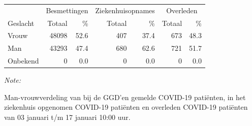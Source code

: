 \documentclass[
  english,
  man,floatsintext]{apa6}
\begin{document}
\begin{table}[H]
\centering\begingroup\fontsize{11}{13}\selectfont

\begin{threeparttable}
\begin{tabular}{lrrrrrr}
\toprule
\multicolumn{1}{c}{ } & \multicolumn{2}{c}{Besmettingen} & \multicolumn{2}{c}{Ziekenhuisopnames} & \multicolumn{2}{c}{Overleden} \\
\cmidrule(l{3pt}r{3pt}){2-3} \cmidrule(l{3pt}r{3pt}){4-5} \cmidrule(l{3pt}r{3pt}){6-7}
Geslacht & Totaal & \% & Totaal & \% & Totaal & \%\\
\midrule
Vrouw & 48098 & 52.6 & 407 & 37.4 & 673 & 48.3\\
Man & 43293 & 47.4 & 680 & 62.6 & 721 & 51.7\\
Onbekend & 0 & 0.0 & 0 & 0.0 & 0 & 0.0\\
\bottomrule
\end{tabular}
\begin{tablenotes}
\item \textit{Note: } 
\item Man-vrouwverdeling van bij de GGD’en gemelde COVID-19 patiënten, in het ziekenhuis opgenomen COVID-19 patiënten en overleden COVID-19 patiënten van 03 januari t/m 17 januari 10:00 uur.
\end{tablenotes}
\end{threeparttable}
\endgroup{}
\end{table}
\newpage
\end{document}
